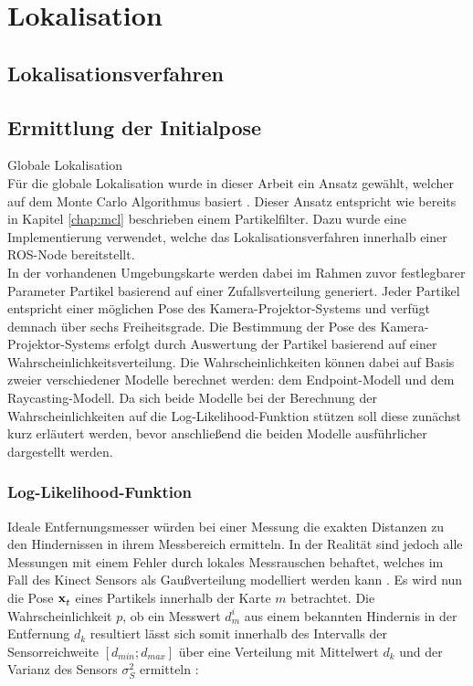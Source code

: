 \chapter{Lokalisation}

\red[Karte?]

\section{Lokalisationsverfahren}

\section{Ermittlung der Initialpose}
\label{chap.globloc}
Globale Lokalisation\\
Für die globale Lokalisation wurde in dieser Arbeit ein Ansatz gewählt, welcher auf dem Monte Carlo Algorithmus basiert . Dieser Ansatz entspricht wie bereits in Kapitel \ref{chap:mcl} beschrieben einem Partikelfilter. Dazu wurde eine Implementierung \cite{humanoid_navigation} verwendet, welche das Lokalisationsverfahren innerhalb einer ROS-Node bereitstellt. \\
In der vorhandenen Umgebungskarte werden dabei im Rahmen zuvor festlegbarer Parameter Partikel basierend auf einer Zufallsverteilung generiert. Jeder Partikel entspricht einer möglichen Pose des Kamera-Projektor-Systems und verfügt demnach über sechs Freiheitsgrade. Die Bestimmung der Pose des Kamera-Projektor-Systems erfolgt durch Auswertung der Partikel basierend auf einer Wahrscheinlichkeitsverteilung. Die Wahrscheinlichkeiten können dabei auf Basis zweier verschiedener Modelle berechnet werden: dem Endpoint-Modell und dem Raycasting-Modell. Da sich beide Modelle bei der Berechnung der Wahrscheinlichkeiten auf die Log-Likelihood-Funktion stützen soll diese zunächst kurz erläutert werden, bevor anschließend die beiden Modelle ausführlicher dargestellt werden.

\subsection{Log-Likelihood-Funktion}
\label{chap.loglik}
Ideale Entfernungsmesser würden bei einer Messung die exakten Distanzen zu den Hindernissen in ihrem Messbereich ermitteln. In der Realität sind jedoch alle Messungen mit einem Fehler durch lokales Messrauschen behaftet, welches im Fall des Kinect Sensors als Gaußverteilung modelliert werden kann \cite{Nguyen2012}. Es wird nun die Pose $\mathbf{x}^{}_{t}$ eines Partikels innerhalb der Karte $m$ betrachtet. Die Wahrscheinlichkeit $p$, ob ein Messwert $d_m^i$ aus einem bekannten Hindernis in der Entfernung $d_k$ resultiert lässt sich somit innerhalb des Intervalls der Sensorreichweite $[d_{min};d_{max}]$ über eine Verteilung mit Mittelwert $d_k$ und der Varianz des Sensors $\sigma_{S}^2$ ermitteln \cite{Thrun2005}:

